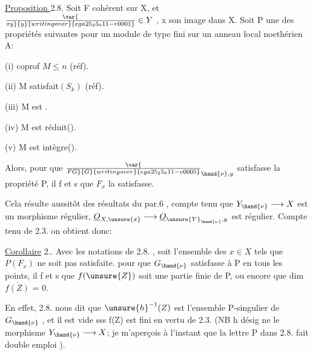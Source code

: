 
\uline{Proposition }2.8.  Soit F cohérent sur X, et  $\var{\over{x}{y}}{y}{writing over}{ega25_25_011-v0001}\in Y$ , x son image
dans X.   Soit P une des propriétés suivantes pour
un module de type fini sur un anneau local noethérien A:

(i)   coprof $M\leqslant n$   (réf).

(ii)  M satisfait$(S_k)$  (réf).

(iii)  M est .

(iv)  M est réduit().

(v)   M est intègre().

Alors, pour que $\var{\over{F}{G}}{G}{writing over}{ega25_25_011-v0005}_{\hand{\nu},y}$ satisfasse la propriété P, il f et s que $F_x$ la
satisfasse.

Cela résulte aussitôt des résultats du par.6 , compte tenu que
 $Y_{\hand{\nu}}\longrightarrow X$  est un morphisme régulier,   $\underline{O}_{X,\unsure{x}}\longrightarrow \underline{O}_{\unsure{Y}_{\hand{\nu}},y}$ est
régulier.  Compte tenu de 2.3. on obtient donc:

\uline{Corollaire} 2..  Avec les notations de 2.8. , soit  l'ensemble
des $x\in X$ tels que $P(F_x)$ ne soit pas satisfaite.  pour que
$G_{\hand{\nu}}$ satisfasse à P en tous les points, il f et s que $f(\unsure{Z})$ soit une
partie finie de P, ou encore que  dim $\overline{f(Z)}$ = 0.

En effet, 2.8. nous dit que $\unsure{h}^{-1}(Z)$ est l'ensemble P-singulier
de $G_{\hand{\nu}}$ , et il est vide sss f(Z) est fini en vertu de 2.3. (NB h désig
 ne le morphisme $Y_{\hand{\nu}}\longrightarrow X$; je m'aperçois à l'instant que la lettre P
 dans 2.8. fait double emploi ).

